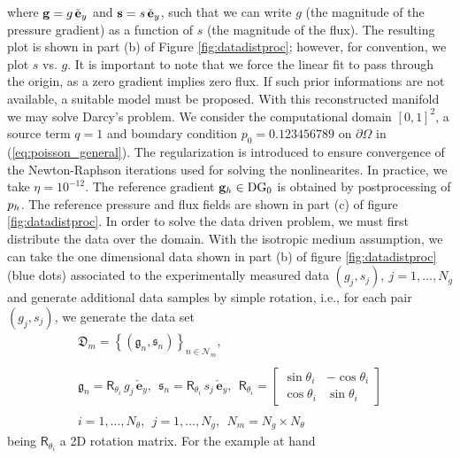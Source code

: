 where $\mathbf{g} = g \, \check{\mathbf{e}}_y$ and $\mathbf{s} = s \, \check{\mathbf{e}}_y$,
such that we can write $g$ (the magnitude of the pressure gradient)
as a function of $s$ (the magnitude of the flux). 
The resulting plot is shown in part (b) of Figure \ref{fig:datadistproc}; however, for convention, we plot $s$ vs. $g$. It is important to note that we force the linear fit to pass through the origin, as a zero gradient implies zero flux.
If such prior informations are not available, a suitable model
must be proposed. With this reconstructed manifold we may solve Darcy's problem.
We consider the computational domain $[0,1]^2$, a source term $q = 1$ and boundary condition
$p_0 = 0.123456789$ on $\partial{\Omega}$ in (\ref{eq:poisson_general}).
 The regularization is
introduced to ensure convergence of the Newton-Raphson iterations 
used for solving the nonlinearites. In practice, we take $\eta = 10^{-12}$. 
The reference gradient $\mathbf{g}_h \in \text{DG}_0$ is obtained by postprocessing
of $p_h$.
The reference pressure and flux fields are shown in part (c) of
figure \ref{fig:datadistproc}. In order to solve the data driven problem,
we must first distribute the data over the domain. With the isotropic medium
assumption, we can take the one dimensional data shown in part (b)
of figure \ref{fig:datadistproc} (blue dots) associated to the
experimentally measured data $(g_j,s_j),~j=1,\dots, N_g$ and
generate additional data samples by simple rotation,
i.e., for each pair $(g_j,s_j)$, we generate the data set
\begin{equation}
  \begin{array}{l}
    \mathfrak{D}_m = \left\lbrace\left(\mathfrak{g}_n,\mathfrak{s}_n\right)\right\rbrace_{n \in \mathcal{N}_m},\\
    ~\\
    
\mathfrak{g}_n = \mathsf{R}_{\theta_i} \, g_j \, \check{\mathbf{e}}_y,~~
\mathfrak{s}_n = \mathsf{R}_{\theta_i} \, s_j \, \check{\mathbf{e}}_y,~~
\mathsf{R}_{\theta_i} = \begin{bmatrix}
  \sin{\theta_i} & -\cos{\theta_i}\\
  \cos{\theta_i} & \sin{\theta_i}
  \end{bmatrix}\\
~\\
i=1,\dots, N_{\theta},~~j=1,\dots,N_g,~~N_m =N_g \times N_{\theta} 
\end{array}
\end{equation}
being $\mathsf{R}_{\theta_i}$ a 2D rotation matrix. For the example at hand
